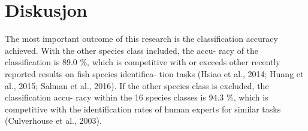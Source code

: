 




\section{Diskusjon}

The most important outcome of this research is the classification accuracy achieved. With the other species class included, the accu- racy of the classification is 89.0 \%, which is competitive with or exceeds other recently reported results on fish species identifica- tion tasks (Hsiao et al., 2014; Huang et al., 2015; Salman et al., 2016). If the other species class is excluded, the classification accu- racy within the 16 species classes is 94.3 \%, which is competitive with the identification rates of human experts for similar tasks (Culverhouse et al., 2003).